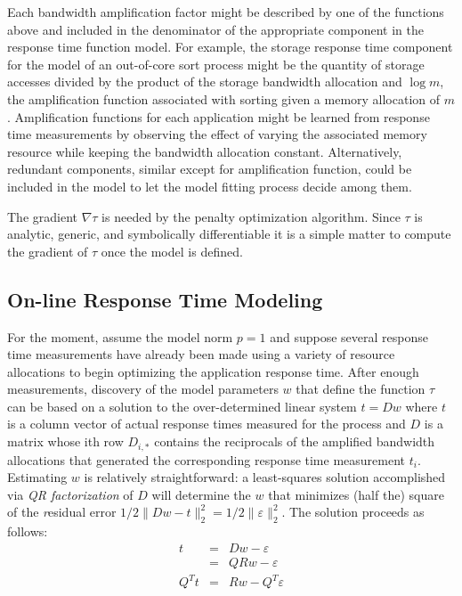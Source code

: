 Each bandwidth amplification factor might be described by one of the functions above
and included in the denominator of the appropriate component in the response time function model.
For example, the storage response time component for the model of an out-of-core sort process might be
the quantity of storage accesses divided by the product of the storage bandwidth allocation and $\log m$,
the amplification function associated with sorting given a memory allocation of $m$.
Amplification functions for each application might be learned from response time measurements
by observing the effect of varying the associated memory resource while keeping the bandwidth allocation constant.
Alternatively, redundant components, similar except for amplification function, could be included in the model
to let the model fitting process decide among them.

The gradient $\nabla\tau$ is needed by the penalty optimization algorithm.
Since $\tau$ is analytic, generic, and symbolically differentiable
it is a simple matter to compute the gradient of $\tau$ once the model is defined.

\subsection*{On-line Response Time Modeling}

For the moment, assume the model norm $p = 1$ and suppose several response time measurements have already been made using a variety of resource allocations to begin optimizing the application response time.  After enough measurements, discovery of the model parameters $w$ that define the function $\tau$ can be based on a solution to the over-determined linear system
$t=Dw$
where $t$ is a column vector of actual response times measured for the process
and $D$ is a matrix whose ith row $D_{i,*}$ contains the reciprocals of the amplified bandwidth allocations
that generated the corresponding response time measurement $t_i$.
Estimating $w$ is relatively straightforward: a least-squares solution accomplished via
\emph{QR factorization}\cite{GoVL} of $D$ will determine the $w$ that minimizes (half the)
square of the \emph residual error $1/2 \|Dw - t\|^2_2 = 1/2 \|\varepsilon\|^2_2$.
The solution proceeds as follows:
\begin{eqnarray*}
t     &=& Dw  - \varepsilon    \\
      &=& QRw - \varepsilon    \\
Q^Tt  &=& Rw  - Q^T\varepsilon
\end{eqnarray*}


